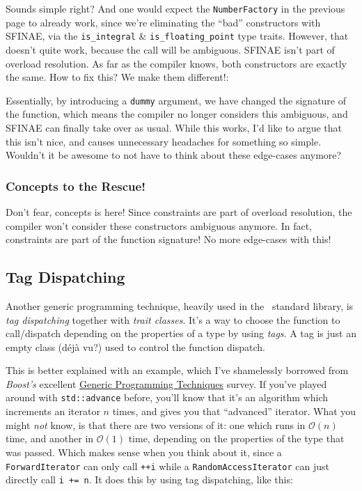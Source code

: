    Sounds simple right? And one would expect the \texttt{NumberFactory} in the previous page to already work, since we're eliminating the ``bad'' constructors with SFINAE, via the \texttt{is\_integral} \& \texttt{is\_floating\_point} type traits. However, that doesn't quite work, because the call will be ambiguous. SFINAE isn't part of overload resolution. As far as the compiler knows, both constructors are exactly the same. How to fix this? We make them different!:

    

    \noindent Essentially, by introducing a \texttt{dummy} argument, we have changed the signature of the function, which means the compiler no longer considers this ambiguous, and SFINAE can finally take over as usual. While this works, I'd like to argue that this isn't nice, and causes unnecessary headaches for something so simple. Wouldn't it be awesome to not have to think about these edge-cases anymore?

    \subsubsection*{Concepts to the Rescue!}

    Don't fear, concepts is here! Since constraints are part of overload resolution, the compiler won't consider these constructors ambiguous anymore. In fact, constraints are part of the function signature! No more edge-cases with this!

    

\subsection{Tag Dispatching} \label{sec:tag_dispatching}

    Another generic programming technique, heavily used in the \Cpp\ standard library, is \emph{tag dispatching} together with \emph{trait classes}. It's a way to choose the function to call/dispatch depending on the properties of a type by using \emph{tags}. A tag is just an empty class (déjà vu?) used to control the function dispatch.

    This is better explained with an example, which I've shamelessly borrowed from \emph{Boost's} excellent \href{https://www.boost.org/community/generic_programming.html#tag_dispatching}{Generic Programming Techniques} survey. If you've played around with \texttt{std::advance} before, you'll know that it's an algorithm which increments an iterator $n$ times, and gives you that ``advanced'' iterator. What you might \emph{not} know, is that there are two versions of it: one which runs in $\mathcal{O}(n)$ time, and another in $\mathcal{O}(1)$ time, depending on the properties of the type that was passed. Which makes sense when you think about it, since a \texttt{ForwardIterator} can only call \texttt{++i} while a \texttt{RandomAccessIterator} can just directly call \texttt{i += n}. It does this by using tag dispatching, like this:

